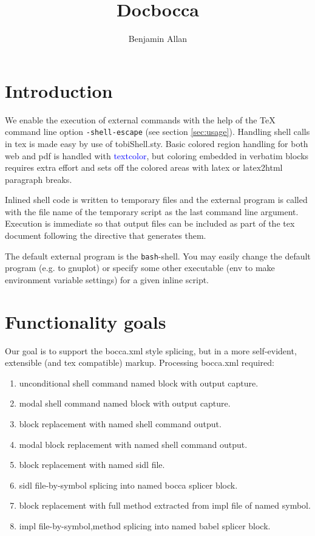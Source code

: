 \documentclass{article}
\begin{document}
\title{Docbocca}
\author{Benjamin Allan}
\maketitle
\tableofcontents

\section{Introduction}
\label{sec:intro}
We enable the execution of external commands with the
help of the \TeX{} command line option \texttt{-shell-escape} (see
section \ref{sec:usage}). Handling shell calls in tex is made easy
by use of tobiShell.sty. Basic colored region handling for both
web and pdf is handled with \textcolor{blue}{textcolor}, but coloring
embedded in verbatim blocks requires extra effort and sets off the colored areas
with latex or latex2html paragraph breaks.

Inlined shell code is written to temporary files and the external program is called with the
file name of the temporary script as the last command line argument.
Execution is immediate so that output files can be included as
part of the tex document following the directive that generates them.

The default external program is the \texttt{bash}-shell. You may
easily change the default program (e.g. to gnuplot) or specify some
other executable (env to make environment variable settings) for a given inline script.

\section{Functionality goals}
\label{sec:goals}
Our goal is to support the bocca.xml style splicing, but in a more
self-evident, extensible (and tex compatible) markup. Processing bocca.xml 
required:
\begin{enumerate}
\item unconditional shell command named block with output capture.
\item modal shell command named block with output capture.
\item block replacement with named shell command output.
\item modal block replacement with named shell command output.
\item block replacement with named sidl file.
\item sidl file-by-symbol splicing into named bocca splicer block.
\item block replacement with full method extracted from impl file of named symbol.
\item impl file-by-symbol,method splicing into named babel splicer block.
\end{enumerate}
\end{document}

